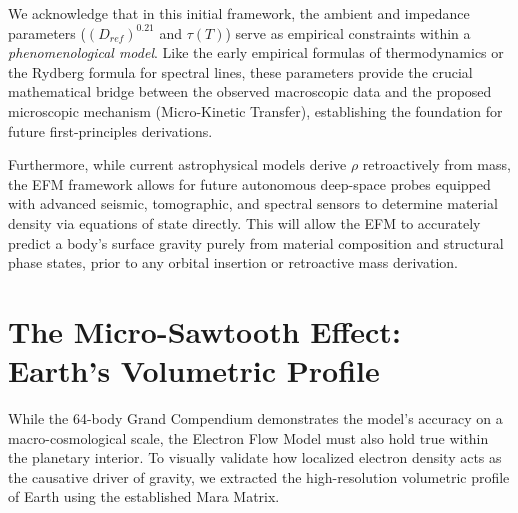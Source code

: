 \documentclass[11pt, a4paper]{article}
\begin{document}
We acknowledge that in this initial framework, the ambient and impedance parameters ($(D_{ref})^{0.21}$ and $\tau(T)$) serve as empirical constraints within a \textit{phenomenological model}. Like the early empirical formulas of thermodynamics or the Rydberg formula for spectral lines, these parameters provide the crucial mathematical bridge between the observed macroscopic data and the proposed microscopic mechanism (Micro-Kinetic Transfer), establishing the foundation for future first-principles derivations.

Furthermore, while current astrophysical models derive $\rho$ retroactively from mass, the EFM framework allows for future autonomous deep-space probes equipped with advanced seismic, tomographic, and spectral sensors to determine material density via equations of state directly. This will allow the EFM to accurately predict a body's surface gravity purely from material composition and structural phase states, prior to any orbital insertion or retroactive mass derivation.

\clearpage
\section{The Micro-Sawtooth Effect: Earth's Volumetric Profile}

  While the 64-body Grand Compendium demonstrates the model's accuracy on a macro-cosmological scale, the Electron Flow Model must also hold true within the planetary interior. To visually validate how localized electron density acts as the causative driver of gravity, we extracted the high-resolution volumetric profile of Earth using the established Mara Matrix.
\end{document}
